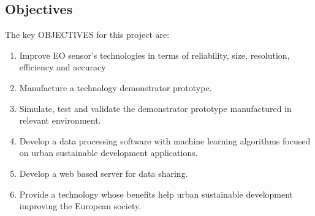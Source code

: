 \subsection{Objectives}

The key OBJECTIVES for this project are:

\begin{enumerate}

	\item Improve EO sensor's technologies in terms of reliability, size, resolution, efficiency and accuracy

	\item Manufacture a technology demonstrator prototype.

	\item Simulate, test and validate the demonstrator prototype manufactured in relevant environment.

	\item Develop a data processing software with machine learning algorithms focused on urban sustainable development applications. 

	\item Develop a web based server for data sharing. 

	\item Provide a technology whose benefits help urban sustainable development improving the European society.
 
\end{enumerate}


